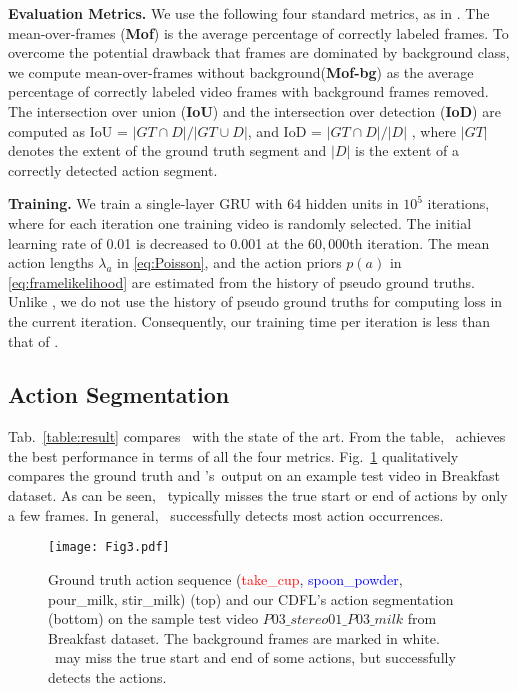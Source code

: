 \documentclass[10pt,twocolumn,letterpaper]{article}
\begin{document}
{\bf  Evaluation  Metrics.} We use the following four standard metrics, as in \cite{bojanowski2014weakly, ding2018weakly}. The mean-over-frames ({\bf Mof}) is the average percentage of correctly labeled frames. To overcome the potential drawback that frames are dominated by background class, we compute mean-over-frames without background({\bf Mof-bg}) as the average percentage of correctly labeled video frames with background frames removed. The intersection over union ({\bf IoU}) and the intersection over detection ({\bf IoD}) are computed as IoU = $|GT\cap D|/|GT\cup D|$, and IoD = $|GT\cap D|/|D|$ , where $|GT|$ denotes the extent of the ground truth segment and $|D|$ is the extent of a correctly detected action segment.

{\bf Training.} We train a single-layer GRU with 
$64$ hidden units
in $10^5$ iterations, where for each iteration one training video is randomly selected. The initial learning rate of 0.01 is decreased to 0.001 at the $60,000$th iteration. The mean action lengths  $\lambda_{a}$ in \eqref{eq:Poisson},  and the action priors $p(a)$ in \eqref{eq:framelikelihood} are estimated from the history of pseudo ground truths. Unlike \cite{richard2018neuralnetwork}, we do not use the history of pseudo ground truths for computing loss in the current iteration. Consequently, our training time per iteration is less than that of \cite{richard2018neuralnetwork}. 









\subsection{Action Segmentation}
 Tab.~\ref{table:result} compares \abbrmodel\ with the state of the art. From the table,  \abbrmodel\ achieves the best performance in terms of all the four metrics.
Fig.~\ref{fig:prediction} qualitatively compares the ground truth and \abbrmodel's\ output on an example test video in Breakfast dataset.
As can be seen, \abbrmodel\ typically misses the true start or end of actions by only a few frames. In general, \abbrmodel\ successfully detects most action occurrences.

\begin{figure}
\centering
\texttt{[image: Fig3.pdf]}
\caption{Ground truth action sequence (\textcolor{red}{take\_cup}, \textcolor{blue}{spoon\_powder}, \textcolor{mypink}{pour\_milk}, \textcolor{myyellow}{stir\_milk}) (top) and our CDFL's action segmentation (bottom) on the sample test video $\textit{P03\_stereo01\_P03\_milk}$ from Breakfast dataset. The background frames are marked in white. \abbrmodel\ may miss the true start and end of some actions, but successfully detects the actions.}
\label{fig:prediction}
\end{figure}
\end{document}
